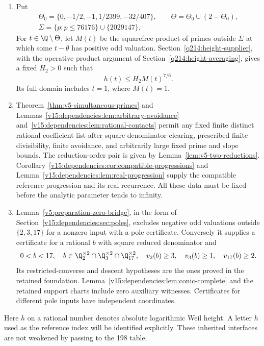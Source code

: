 \begin{enumerate}
Corollary~\ref{v15:logs:cor:uniform-logarithm-ratio} give the
formal-logarithm isometry and relative error of order four at the
consumed good unramified odd primes. The convention $z(O)=0$ is
allowed. Section~\ref{q214:factor-source} proves the valuation
separation and cleared-trace extraction for the five factors used
below, including negative test valuations, zero tests, and split
or inert places. Its integrality step precedes the use of relative
precision as an absolute congruence.
\item Put
\[
 \begin{gathered}
 \Theta_0=\{0,-1/2,-1,1/2399,-32/407\},\qquad
 \Theta=\Theta_0\cup(2-\Theta_0),\\
 \Sigma=\{p:p\le76176\}\cup\{2029147\}.
 \end{gathered}
\]
For $t\in\Q\setminus\Theta$, let $M(t)$ be the squarefree product
of primes outside $\Sigma$ at which some $t-\theta$ has positive
odd valuation. Section~\ref{q214:height-supplier}, with the
operative product argument of Section~\ref{q214:height-averaging},
gives a fixed $H_2>0$ such that
\[
                         h(t)\le H_2M(t)^{7/6}.
\]
Its full domain includes $t=1$, where $M(t)=1$.
\item Theorem~\ref{thm:v5-simultaneous-primes} and
Lemmas~\ref{v15:dependencies:lem:arbitrary-avoidance}
and~\ref{v15:dependencies:lem:rational-contacts} permit any fixed
finite distinct rational coefficient list after square-denominator
clearing, prescribed finite divisibility, finite avoidance, and
arbitrarily large fixed prime and slope bounds. The reduction-order
pair is given by Lemma~\ref{lem:v5-two-reductions}.
Corollary~\ref{v15:dependencies:cor:compatible-progressions} and
Lemma~\ref{v15:dependencies:lem:real-progression} supply the compatible
reference progression and its real recurrence. All these data must
be fixed before the analytic parameter tends to infinity.
\item Lemma~\ref{v5:preparation-zero-bridge}, in the form of
Section~\ref{v15:dependencies:sec:poles}, excludes negative odd
valuations outside $\{2,3,17\}$ for a nonzero input with a pole
certificate. Conversely it supplies a certificate for a rational
$b$ with square reduced denominator and
\[
 0<b<17,\quad b\in\Q_2^{\times2}\cap\Q_3^{\times2}
 \cap\Q_{17}^{\times2},\quad
 v_2(b)\ge3,\quad v_3(b)\ge1,\quad v_{17}(b)\ge2.
\]
Its restricted-converse and descent hypotheses are the ones proved
in the retained foundation. Lemma~\ref{v15:dependencies:lem:conic-complete}
and the retained support charts include zero auxiliary witnesses.
Certificates for different pole inputs have independent coordinates.
\end{enumerate}
Here $h$ on a rational number denotes absolute logarithmic Weil
height. A letter $h$ used as the reference index will be identified
explicitly. These inherited interfaces are not weakened by passing
to the 198 table.

